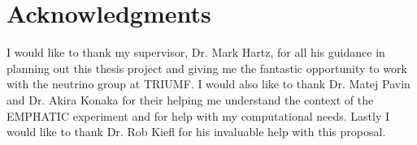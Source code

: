 
\chapter{Acknowledgments}

I would like to thank my supervisor, Dr. Mark Hartz, for all his guidance in planning out this thesis project and giving me the fantastic opportunity to work with the neutrino group at TRIUMF.
I would also like to thank Dr. Matej Pavin and Dr. Akira Konaka for their helping me understand the context of the EMPHATIC experiment and for help with my computational needs.
Lastly I would like to thank Dr. Rob Kiefl for his invaluable help with this proposal.